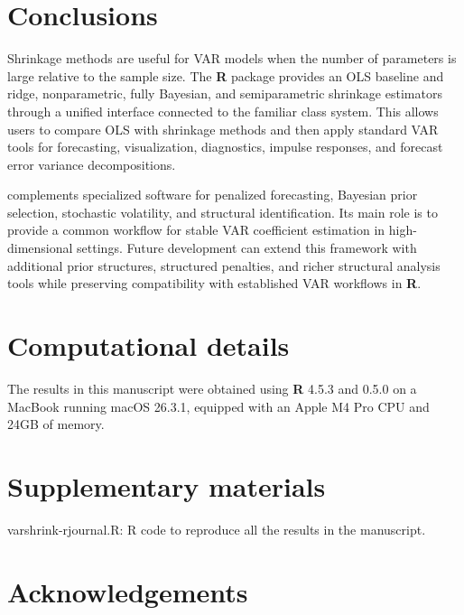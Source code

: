 \section{Conclusions}\label{conclusions}

Shrinkage methods are useful for VAR models when the number of
parameters is large relative to the sample size. The \textbf{R} package
 provides an OLS baseline and ridge, nonparametric,
fully Bayesian, and semiparametric shrinkage estimators through a unified
interface connected to the familiar  class system. This
allows users to compare OLS with shrinkage methods and then apply standard
VAR tools for forecasting,
visualization, diagnostics, impulse responses, and forecast error
variance decompositions.

 complements specialized software for penalized
forecasting, Bayesian prior selection, stochastic volatility, and
structural identification. Its main role is to provide a common workflow
for stable VAR coefficient estimation in high-dimensional settings.
Future development can extend this framework with additional prior
structures, structured penalties, and richer structural analysis tools
while preserving compatibility with established VAR workflows in \textbf{R}.

\section*{Computational details}\label{computational-details}

The results in this manuscript were obtained using \textbf{R} 4.5.3 and  0.5.0 on a MacBook running macOS 26.3.1, equipped with an Apple M4 Pro CPU and 24GB of memory.

\section*{Supplementary materials}\label{supplementary-materials}

varshrink-rjournal.R: R code to reproduce all the results in the manuscript.

\section*{Acknowledgements}\label{acknowledgements}

